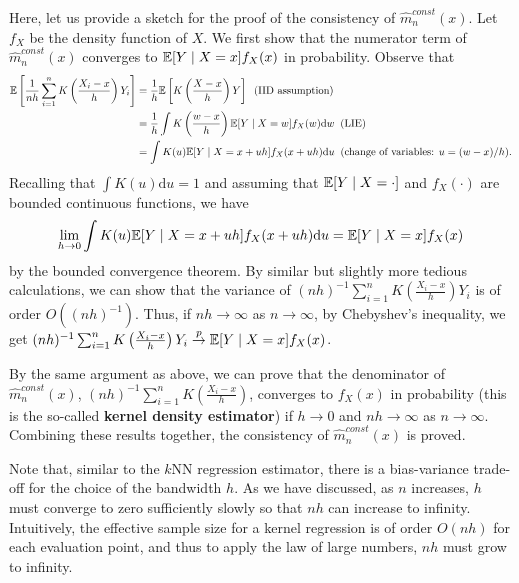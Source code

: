 \documentclass[11pt, A4paper, openany, uplatex]{book}
\begin{document}
Here, let us provide a sketch for the proof of the consistency of $\hat m^{const}_n(x)$.
Let $f_X$ be the density function of $X$.
We first show that the numerator term of $\hat m^{const}_n(x)$ converges to $\mathbb{E}[Y \mid X = x]f_X(x)$ in probability.
Observe that
\begin{align*}
	\mathbb{E}\left[\frac{1}{nh} \sum_{i = 1}^n K\left( \frac{X_i - x}{h}\right) Y_i \right] 
	& = \frac{1}{h}\mathbb{E}\left[ K\left( \frac{X - x}{h}\right) Y \right] \;\; \text{(IID assumption)}\\
	& = \frac{1}{h}\int K\left( \frac{w - x}{h}\right) \mathbb{E}[ Y \mid X = w] f_X (w)\text{d}w \;\; \text{(LIE)} \\
	& = \int K(u) \mathbb{E}[ Y \mid X = x + uh] f_X (x + uh)\text{d}u \;\; \text{(change of variables: $u = (w-x)/h$)}.
\end{align*}
Recalling that $\int K(u)\text{d}u = 1$ and assuming that $\mathbb{E}[ Y \mid X = \cdot]$ and $f_X (\cdot)$ are bounded continuous functions, we have 
\begin{align*}
	\lim_{h \to 0} \int K(u) \mathbb{E}[ Y \mid X = x + uh] f_X (x + uh)\text{d}u = \mathbb{E}[ Y \mid X = x] f_X (x)
\end{align*}
by the bounded convergence theorem.
By similar but slightly more tedious calculations, we can show that the variance of $(nh)^{-1} \sum_{i = 1}^n K\left( \frac{X_i - x}{h}\right) Y_i$ is of order $O((nh)^{-1})$.
Thus, if $nh \to \infty$ as $n \to \infty$, by Chebyshev's inequality, we get $(nh)^{-1} \sum_{i = 1}^n K\left( \frac{X_i - x}{h}\right) Y_i \overset{p}{\to} \mathbb{E}[ Y \mid X = x] f_X (x)$.

By the same argument as above, we can prove that the denominator of $\hat m^{const}_n(x)$, $(nh)^{-1} \sum_{i = 1}^n K\left( \frac{X_i - x}{h}\right)$, converges to $f_X(x)$ in probability (this is the so-called \textbf{kernel density estimator}) if $h \to 0$ and $nh \to \infty$ as $n \to \infty$.
Combining these results together, the consistency of $\hat m^{const}_n(x)$ is proved.

Note that, similar to the $k$NN regression estimator, there is a bias-variance trade-off for the choice of the bandwidth $h$.
As we have discussed, as $n$ increases, $h$ must converge to zero sufficiently slowly so that $nh$ can increase to infinity.
Intuitively, the effective sample size for a kernel regression is of order $O(nh)$ for each evaluation point, and thus to apply the law of large numbers, $nh$ must grow to infinity.

\bigskip
\end{document}

